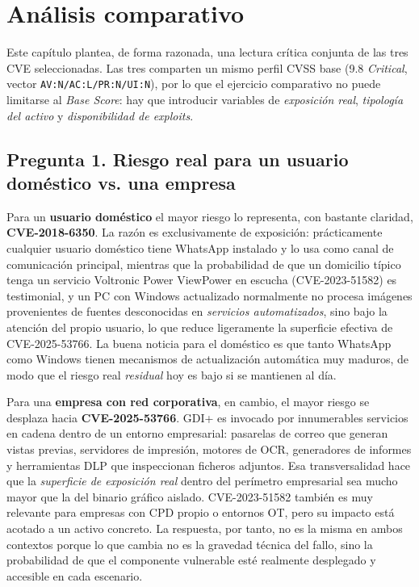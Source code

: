 \chapter{Análisis comparativo}

Este capítulo plantea, de forma razonada, una lectura crítica conjunta de las tres CVE seleccionadas. Las tres comparten un mismo perfil CVSS base (9.8 \textit{Critical}, vector \texttt{AV:N/AC:L/PR:N/UI:N}), por lo que el ejercicio comparativo no puede limitarse al \textit{Base Score}: hay que introducir variables de \textit{exposición real}, \textit{tipología del activo} y \textit{disponibilidad de exploits}.

\section*{Pregunta 1. Riesgo real para un usuario doméstico vs. una empresa}

Para un \textbf{usuario doméstico} el mayor riesgo lo representa, con bastante claridad, \textbf{CVE-2018-6350}. La razón es exclusivamente de exposición: prácticamente cualquier usuario doméstico tiene WhatsApp instalado y lo usa como canal de comunicación principal, mientras que la probabilidad de que un domicilio típico tenga un servicio Voltronic Power ViewPower en escucha (CVE-2023-51582) es testimonial, y un PC con Windows actualizado normalmente no procesa imágenes provenientes de fuentes desconocidas en \textit{servicios automatizados}, sino bajo la atención del propio usuario, lo que reduce ligeramente la superficie efectiva de CVE-2025-53766. La buena noticia para el doméstico es que tanto WhatsApp como Windows tienen mecanismos de actualización automática muy maduros, de modo que el riesgo real \textit{residual} hoy es bajo si se mantienen al día.

Para una \textbf{empresa con red corporativa}, en cambio, el mayor riesgo se desplaza hacia \textbf{CVE-2025-53766}. GDI+ es invocado por innumerables servicios en cadena dentro de un entorno empresarial: pasarelas de correo que generan vistas previas, servidores de impresión, motores de OCR, generadores de informes y herramientas DLP que inspeccionan ficheros adjuntos. Esa transversalidad hace que la \textit{superficie de exposición real} dentro del perímetro empresarial sea mucho mayor que la del binario gráfico aislado. CVE-2023-51582 también es muy relevante para empresas con CPD propio o entornos OT, pero su impacto está acotado a un activo concreto. La respuesta, por tanto, no es la misma en ambos contextos porque lo que cambia no es la gravedad técnica del fallo, sino la probabilidad de que el componente vulnerable esté realmente desplegado y accesible en cada escenario.

